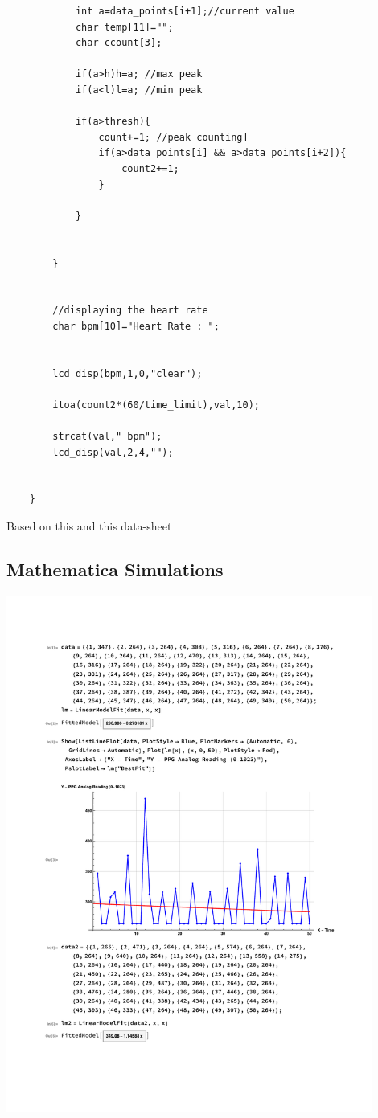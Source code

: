\documentclass[12pt]{article}
\begin{document}
{\begin{lstlisting}
			int a=data_points[i+1];//current value
			char temp[11]="";
			char ccount[3];
	
			if(a>h)h=a; //max peak
			if(a<l)l=a; //min peak
			
			if(a>thresh){
				count+=1; //peak counting]
				if(a>data_points[i] && a>data_points[i+2]){
					count2+=1;
				}
				
			}
		
		
		}
	
	
		//displaying the heart rate
		char bpm[10]="Heart Rate : ";
		
		
		lcd_disp(bpm,1,0,"clear");
		
		itoa(count2*(60/time_limit),val,10);
	
		strcat(val," bpm");
		lcd_disp(val,2,4,"");
	
	
	}
\end{lstlisting}
	Based on this \cite{avr_analog} and this data-sheet \cite{atmega32_datasheet}
	

\subsection{Mathematica Simulations}
\includegraphics[page=1,width=0.9\textwidth]{images/simulation1}

}
\end{document}
